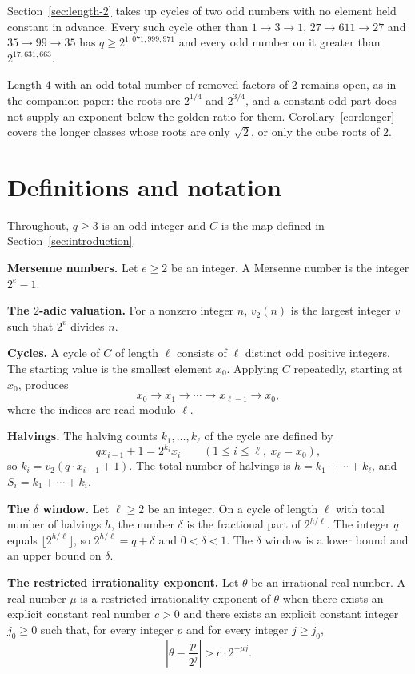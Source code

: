 \documentclass[11pt]{article}
\newcommand{\topic}[1]{\par\noindent\textbf{#1}}
\begin{document}
Section~\ref{sec:length-2} takes up cycles of two odd numbers with no element held constant in advance.
Every such cycle other than $1 \to 3 \to 1$, $27 \to 611 \to 27$ and $35 \to 99 \to 35$ has $q \ge 2^{1{,}071{,}999{,}971}$ and every odd number on it greater than $2^{17{,}631{,}663}$.

Length $4$ with an odd total number of removed factors of $2$ remains open, as in the companion paper: the roots are $2^{1/4}$ and $2^{3/4}$, and a constant odd part does not supply an exponent below the golden ratio for them.
Corollary~\ref{cor:longer} covers the longer classes whose roots are only $\sqrt{2}$, or only the cube roots of $2$.

\section{Definitions and notation}
\label{sec:definitions}

Throughout, $q \ge 3$ is an odd integer and $C$ is the map defined in Section~\ref{sec:introduction}.

\topic{Mersenne numbers.}
Let $e \ge 2$ be an integer.
A Mersenne number is the integer $2^e - 1$.

\topic{The $2$-adic valuation.}
For a nonzero integer $n$, $v_2(n)$ is the largest integer $v$ such that $2^v$ divides $n$.

\topic{Cycles.}
A cycle of $C$ of length $\ell$ consists of $\ell$ distinct odd positive integers.
The starting value is the smallest element $x_0$.
Applying $C$ repeatedly, starting at $x_0$, produces
\[
x_0 \to x_1 \to \cdots \to x_{\ell-1} \to x_0,
\]
where the indices are read modulo $\ell$.

\topic{Halvings.}
The halving counts $k_1, \ldots, k_\ell$ of the cycle are defined by
\[
q x_{i-1} + 1 = 2^{k_i} x_i
\qquad (1 \le i \le \ell,\ x_\ell = x_0),
\]
so $k_i = v_2(q \cdot x_{i-1} + 1)$.
The total number of halvings is $h = k_1 + \cdots + k_\ell$, and $S_i = k_1 + \cdots + k_i$.

\topic{The $\delta$ window.}
Let $\ell \ge 2$ be an integer.
On a cycle of length $\ell$ with total number of halvings $h$, the number $\delta$ is the fractional part of $2^{h/\ell}$.
The integer $q$ equals $\lfloor 2^{h/\ell} \rfloor$, so $2^{h/\ell} = q + \delta$ and $0 < \delta < 1$.
The $\delta$ window is a lower bound and an upper bound on $\delta$.

\topic{The restricted irrationality exponent.}
Let $\theta$ be an irrational real number.
A real number $\mu$ is a restricted irrationality exponent of $\theta$ when there exists an explicit constant real number $c > 0$ and there exists an explicit constant integer $j_0 \ge 0$ such that, for every integer $p$ and for every integer $j \ge j_0$,
\[
\left|\theta - \frac{p}{2^j}\right| > c \cdot 2^{-\mu j}.
\]
\end{document}
